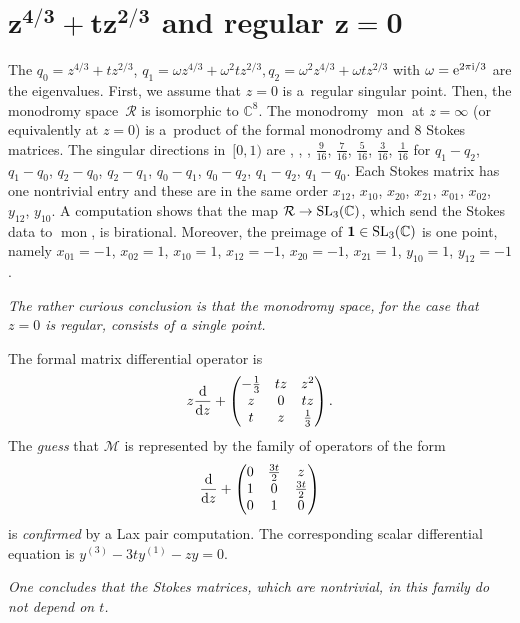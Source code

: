 \documentclass[10pt,a4paper]{amsart}
\numberwithin{equation}{section}
\begin{document}
\section[z-power(4/3)+t*z-power(2/3) and regular z=0]{$\boldsymbol{z^{4/3}+tz^{2/3}}$ and regular $\boldsymbol{z=0}$}\label{three}
The $q_0=z^{4/3}+tz^{2/3}$, $q_1=\omega z^{4/3}+\omega ^2tz^{2/3},
q_2=\omega^2z^{4/3}+\omega tz^{2/3}$ with $\omega={\rm e}^{2\pi {\rm i} /3}$ are the eigenvalues. First, we assume that $z=0$ is a~regular singular point. Then, the monodromy
space~$\mathcal{R}$ is isomorphic to $\mathbb{C}^8$. The monodromy $\operatorname{mon}$ at $z=\infty$ (or equivalently at $z=0$) is a~product of the formal monodromy and 8 Stokes matrices. The singular directions in~$[0,1)$ are
, , , $\frac{9}{16}$, $\frac{7}{16}$, $\frac{5}{16}$, $\frac{3}{16}$, $\frac{1}{16}$
for $q_1-q_2$, $q_1-q_0$, $q_2-q_0$, $q_2-q_1$, $q_0-q_1$, $q_0-q_2$, $q_1-q_2$, $q_1-q_0$.
Each Stokes matrix has one nontrivial entry and these are in the same order
$x_{12}$, $x_{10}$, $x_{20}$, $x_{21}$, $x_{01}$, $x_{02}$, $y_{12}$, $y_{10}$.
A computation shows that the map $\mathcal{R}\rightarrow {\rm SL}_3(\mathbb{C})$, which send the Stokes data to $\operatorname{mon}$,
is birational. Moreover, the preimage of ${\bf 1} \in {\rm SL}_3(\mathbb{C})$ is one point, namely
$x_{01} = -1$, $ x_{02} = 1$, $ x_{10} = 1$, $ x_{12} = -1$, $ x_{20} = -1$, $ x_{21} = 1$, $ y_{10} = 1$, $ y_{12} = -1$.

 {\it The rather curious conclusion is that the monodromy space, for the case that $z=0$ is regular, consists of a single point.}

The formal matrix differential operator is
\[
z\frac{{\rm d}}{{\rm d}z}+ \begin{pmatrix} -\frac{1}{3} &tz &z^2 \\ z&0 & tz \\ t& z& \frac{1}{3} \end{pmatrix}.\]
The {\it guess} that $\mathcal{M}$ is represented by the family of operators of the form
\[\frac{{\rm d}}{{\rm d}z}+ {\begin{pmatrix} 0 &\frac{3t}{2} &z \\ 1&0 & \frac{3t}{2} \\ 0& 1& 0 \end{pmatrix}}
\]
is {\it confirmed} by a Lax pair computation. The corresponding scalar differential equation is $y^{(3)}-3ty^{(1)}-zy=0$.

 {\it One concludes that the Stokes
matrices, which are nontrivial, in this family do not depend on $t$.}
\end{document}
